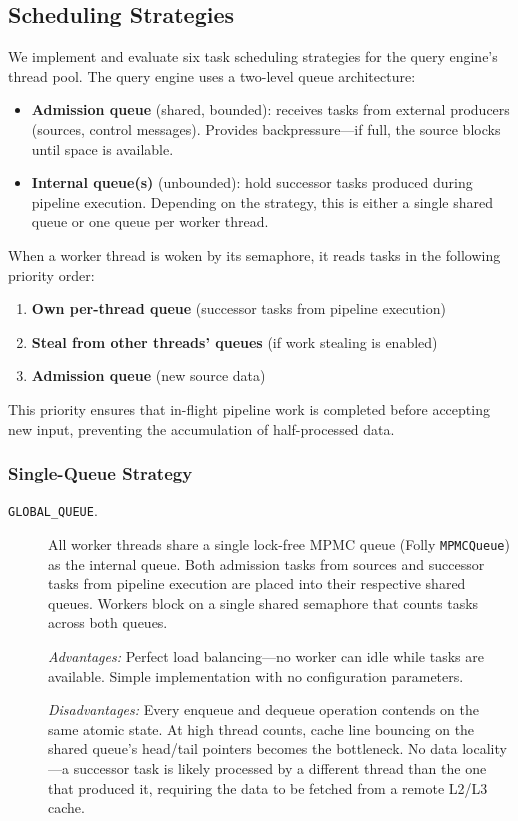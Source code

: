 \subsection{Scheduling Strategies}
\label{sec:scheduling-strategies}

We implement and evaluate six task scheduling strategies for the query engine's thread pool.
The query engine uses a two-level queue architecture:

\begin{itemize}
    \item \textbf{Admission queue} (shared, bounded): receives tasks from external producers (sources, control messages). Provides backpressure---if full, the source blocks until space is available.
    \item \textbf{Internal queue(s)} (unbounded): hold successor tasks produced during pipeline execution. Depending on the strategy, this is either a single shared queue or one queue per worker thread.
\end{itemize}

When a worker thread is woken by its semaphore, it reads tasks in the following priority order:
\begin{enumerate}
    \item \textbf{Own per-thread queue} (successor tasks from pipeline execution)
    \item \textbf{Steal from other threads' queues} (if work stealing is enabled)
    \item \textbf{Admission queue} (new source data)
\end{enumerate}
This priority ensures that in-flight pipeline work is completed before accepting new input, preventing the accumulation of half-processed data.

\subsubsection{Single-Queue Strategy}

\begin{description}
    \item[\texttt{GLOBAL\_QUEUE}.]
    All worker threads share a single lock-free MPMC queue (Folly \texttt{MPMCQueue}) as the internal queue.
    Both admission tasks from sources and successor tasks from pipeline execution are placed into their respective shared queues.
    Workers block on a single shared semaphore that counts tasks across both queues.

    \textit{Advantages:} Perfect load balancing---no worker can idle while tasks are available.
    Simple implementation with no configuration parameters.

    \textit{Disadvantages:} Every enqueue and dequeue operation contends on the same atomic state.
    At high thread counts, cache line bouncing on the shared queue's head/tail pointers becomes the bottleneck.
    No data locality---a successor task is likely processed by a different thread than the one that produced it, requiring the data to be fetched from a remote L2/L3 cache.
\end{description}


